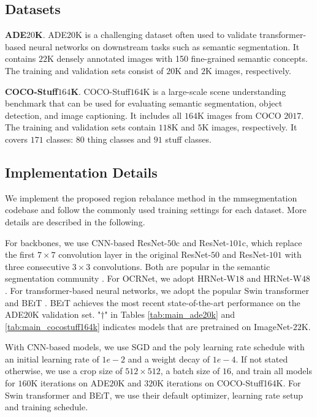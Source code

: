\documentclass[final]{cvpr}
\begin{document}
\subsection{Datasets}
\vspace{1mm}
\noindent\textbf{ADE$20$K}.
ADE$20$K \cite{zhou2017scene} is a challenging dataset often used to validate transformer-based neural networks on downstream tasks such as semantic segmentation. It contains $22$K densely annotated images with 150 fine-grained semantic concepts. The training and validation sets consist of $20$K and $2$K images, respectively.

\vspace{1mm}
\noindent\textbf{COCO-Stuff$164$K}.
COCO-Stuff$164$K \cite{caesar2018coco} is a large-scale scene understanding benchmark that can be used for evaluating semantic segmentation, object detection, and image captioning. It includes all $164$K images from COCO $2017$. The training and validation sets contain $118$K and $5$K images, respectively. It covers $171$ classes: $80$ thing classes and $91$ stuff classes.


\subsection{Implementation Details}
We implement the proposed region rebalance method in the mmsegmentation codebase \cite{mmseg2020} and follow the commonly used training settings for each dataset. More details are described in the following.


For backbones, we use CNN-based ResNet-$50$c and ResNet-$101$c, which replace the first $7 \times 7$ convolution layer in the original ResNet-$50$ and ResNet-$101$ with three consecutive $3 \times 3$ convolutions. Both are popular in the semantic segmentation community \cite{DBLP:conf/cvpr/ZhaoSQWJ17}. For OCRNet, we adopt HRNet-W$18$ and HRNet-W$48$ \cite{wang2020deep}. For transformer-based neural networks, we adopt the popular Swin transformer \cite{liu2021swin} and \textsc{BEiT} \cite{bao2021beit}. \textsc{BEiT} achieves the most recent state-of-the-art performance on the ADE$20$K validation set. "$\dag$" in Tables \ref{tab:main_ade20k} and \ref{tab:main_cocostuff164k} indicates models that are pretrained on ImageNet-$22$K.


With CNN-based models, we use SGD and the poly learning rate schedule \cite{DBLP:conf/cvpr/ZhaoSQWJ17} with an initial learning rate of $1e-2$ and a weight decay of $1e-4$. If not stated otherwise, we use a crop size of $512 \times 512$, a batch size of $16$, and train all models for $160$K iterations on ADE$20$K and $320$K iterations on COCO-Stuff164K. For Swin transformer and \textsc{BEiT}, we use their default optimizer, learning rate setup and training schedule.  
\end{document}
